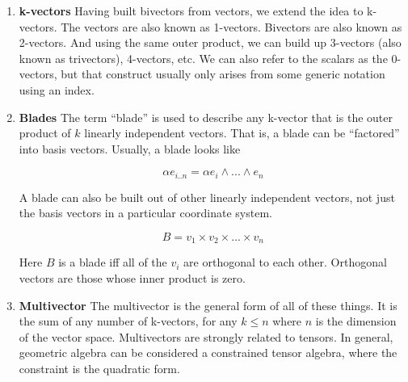 \documentclass[8pt]{article}
\begin{document}
\begin{enumerate}
        where $e_{ij}$ is an element of a new vector space whose elements are called the \emph{bivectors}. Note that this notation also implies a meaning to adding a scalar to a bivector. The basis vectors of the bivector vector space are the result of ``multiplying'' basis vectors of the vector vector space using a second form of multiplication called the ``outer product''. As $\eta$ is a diagonal matrix, for basis vectors, a basis bivector is the outer product of two basis vectors. It is also the geometric product of two basis vectors, as the scalar term, the quadratic form, is zero. Notationally, for basis vectors only, we have

        \[
        e_{ij} = e_i e_j = e_i \wedge e_j
        \]

        This is crazy on several levels. One, we are defining multiplication of vectors. Two, we are allowing the addition of a scalar to elements of a vector space, the bivectors. Three, we are building two operations that bridge a scalar field and two separate vector spaces. Four, there is third operation hiding behind the quadratic form calculation that will be a form of inner product. These operations will be fleshed out more in the next section.

  \item \textbf{k-vectors}
        Having built bivectors from vectors, we extend the idea to k-vectors. The vectors are also known as 1-vectors. Bivectors are also known as 2-vectors. And using the same outer product, we can build up 3-vectors (also known as trivectors), 4-vectors, etc. We can also refer to the scalars as the 0-vectors, but that construct usually only arises from some generic notation using an index.

  \item \textbf{Blades}
        The term ``blade'' is used to describe any k-vector that is the outer product of $k$ linearly independent vectors. That is, a blade can be ``factored'' into basis vectors. Usually, a blade looks like

        \[
        \alpha e_{i..n} = \alpha e_i \wedge ... \wedge e_n
        \]

        A blade can also be built out of other linearly independent vectors, not just the basis vectors in a particular coordinate system.

        \[
        B = v_1 \times v_2 \times ... \times v_n
        \]

        Here $B$ is a blade iff all of the $v_i$ are orthogonal to each other. Orthogonal vectors are those whose inner product is zero.

  \item \textbf{Multivector}
        The multivector is the general form of all of these things. It is the sum of any number of k-vectors, for any $k \leq n$ where $n$ is the dimension of the vector space. Multivectors are strongly related to tensors. In general, geometric algebra can be considered a constrained tensor algebra, where the constraint is the quadratic form.

\end{enumerate}
\end{document}
